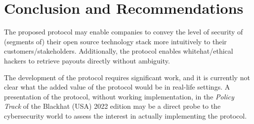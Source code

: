 \section{Conclusion and Recommendations}
\label{sec:conclusion}
The proposed protocol may enable companies to convey the level of security of (segments of) their open source technology stack more intuitively to their customers/stakeholders. Additionally, the protocol enables whitehat/ethical hackers to retrieve payouts directly without ambiguity. 

The development of the protocol requires significant work, and it is currently not clear what the added value of the protocol would be in real-life settings. A presentation of the protocol, without working implementation, in the \textit{Policy Track} of the Blackhat (USA) 2022 edition may be a direct probe to the cybersecurity world to assess the interest in actually implementing the protocol.




